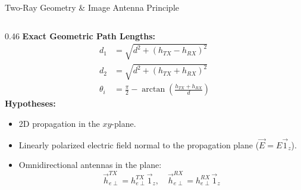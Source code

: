 \documentclass[aspectratio=169, 10pt]{beamer}
\begin{document}
\begin{frame}{Two-Ray Geometry \& Image Antenna Principle}
\begin{columns}[c]
        \begin{column}{0.46\textwidth}
            \textbf{Exact Geometric Path Lengths:}
            \begin{align}
                d_1 &= \sqrt{d^2 + (h_{TX} - h_{RX})^2} \label{eq:d1} \\
                d_2 &= \sqrt{d^2 + (h_{TX} + h_{RX})^2} \label{eq:d2} \\
                \theta_i &= \frac{\pi}{2} - \arctan\left(\frac{h_{TX} + h_{RX}}{d}\right) \label{eq:theta_i}
            \end{align}
            \textbf{Hypotheses:}
            \begin{itemize}
                \item 2D propagation in the $xy$-plane.
                \item Linearly polarized electric field normal to the propagation plane ($\vec{E} = E\vec{1}_z$).
                \item Omnidirectional antennas in the plane:
                \begin{equation}
                    \vec{h}_{e\perp}^{TX} = h_{e\perp}^{TX}\vec{1}_z, \quad \vec{h}_{e\perp}^{RX} = h_{e\perp}^{RX}\vec{1}_z
                \end{equation}
            \end{itemize}
        \end{column}
    \end{columns}
\end{frame}
\end{document}
